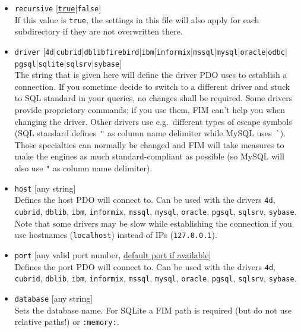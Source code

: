 \documentclass{scrartcl}
\begin{document}
      \begin{itemize}
         \item \texttt{recursive} [\underline{\texttt{true}}|\texttt{false}] \\
            If this value is \texttt{true}, the settings in this file will also apply for each subdirectory if they are not overwritten there.
         \item \texttt{driver} [\texttt{4d}|\texttt{cubrid}|\texttt{dblib}\texttt{firebird}|\texttt{ibm}|\texttt{informix}|\texttt{mssql}|\texttt{mysql}|\texttt{oracle}|\texttt{odbc}| \\ \texttt{pgsql}|\texttt{sqlite}|\texttt{sqlsrv}|\texttt{sybase}] \\
            The string that is given here will define the driver PDO uses to establish a connection. If you sometime decide to switch to a different driver and stuck to SQL standard in your queries, no changes shall be required. Some drivers provide proprietary commands; if you use them, FIM can't help you when changing the driver. Other drivers use e.g.\ different types of escape symbols (SQL standard defines~\verb!"! as column name delimiter while MySQL uses~\verb!`!). Those specialties can normally be changed and FIM will take measures to make the engines as much standard-compliant as possible (so MySQL will also use \verb!"! as column name delimiter).
         \item \texttt{host} [any string] \\
            Defines the host PDO will connect to. Can be used with the drivers \texttt{4d}, \texttt{cubrid}, \texttt{dblib}, \texttt{ibm}, \texttt{informix}, \texttt{mssql}, \texttt{mysql}, \texttt{oracle}, \texttt{pgsql}, \texttt{sqlsrv}, \texttt{sybase}. Note that some drivers may be slow while establishing the connection if you use hostnames (\texttt{localhost}) instead of IPs (\texttt{127.0.0.1}).
         \item \texttt{port} [any valid port number, \underline{default port if available}] \\
            Defines the port PDO will connect to. Can be used with the drivers \texttt{4d}, \texttt{cubrid}, \texttt{dblib}, \texttt{ibm}, \texttt{informix}, \texttt{mssql}, \texttt{mysql}, \texttt{oracle}, \texttt{pgsql}, \texttt{sqlsrv}, \texttt{sybase}.
         \item \texttt{database} [any string] \\
            Sets the database name. For SQLite a FIM path is required (but do not use relative paths!) or \texttt{:memory:}.

\end{itemize}
\end{document}
